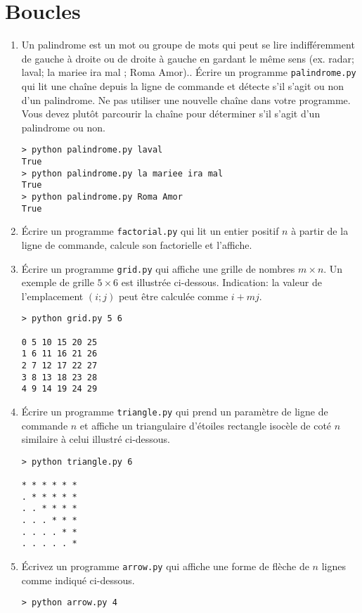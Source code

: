 \documentclass[a4paper]{article}
\begin{document}
\section{Boucles}
\begin{enumerate}
\item Un palindrome est un mot ou groupe de mots qui peut se lire indifféremment de gauche à droite ou de droite à gauche en gardant le même sens (ex. radar; laval; la mariee ira mal ; Roma Amor)..  Écrire un programme {\tt palindrome.py} qui lit une chaîne depuis la ligne de commande et détecte s'il s'agit ou non d'un palindrome. Ne pas utiliser une nouvelle chaîne dans votre programme. Vous devez plutôt parcourir la chaîne pour déterminer s'il s'agit d'un palindrome ou non.
\begin{verbatim}
> python palindrome.py laval
True
> python palindrome.py la mariee ira mal
True
> python palindrome.py Roma Amor
True
\end{verbatim}


\item Écrire un programme {\tt factorial.py} qui lit un entier positif $n$ à partir de la ligne de commande, calcule son
factorielle et l'affiche.
\item Écrire un programme {\tt grid.py} qui affiche une  grille de nombres $m\times  n$. Un exemple de grille $5\times  6$ est illustrée ci-dessous. Indication: la valeur de l'emplacement $(i; j)$ peut être calculée comme $i + mj$.

\begin{verbatim}
> python grid.py 5 6

0 5 10 15 20 25
1 6 11 16 21 26
2 7 12 17 22 27
3 8 13 18 23 28
4 9 14 19 24 29
\end{verbatim}

\item Écrire un programme {\tt triangle.py} qui prend un paramètre de ligne de commande $n$ et affiche un  triangulaire d'étoiles rectangle isocèle de coté $n$ similaire à celui illustré ci-dessous.

\begin{verbatim}
> python triangle.py 6

* * * * * *
. * * * * *
. . * * * *
. . . * * *
. . . . * *
. . . . . *
\end{verbatim}
\item Écrivez un programme {\tt arrow.py} qui affiche une forme de flèche de $n$ lignes comme indiqué ci-dessous.
\begin{verbatim}
> python arrow.py 4


\end{verbatim}
\end{enumerate}
\end{document}
